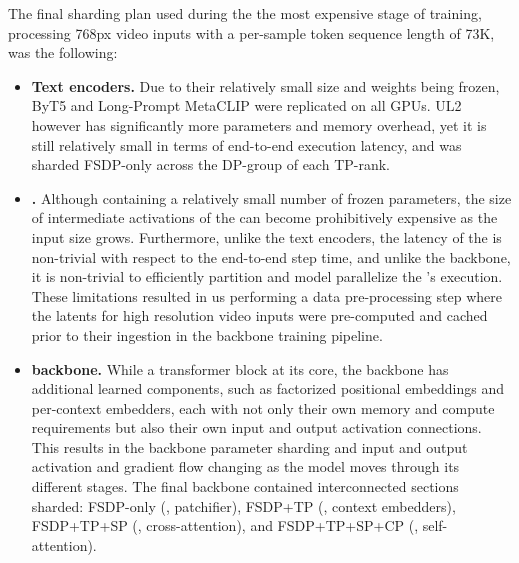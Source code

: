 The final sharding plan used during the the most expensive stage of \OursVideo training, processing 768px video inputs with a per-sample token sequence length of 73K, was the following:
\begin{itemize}
  \item \textbf{Text encoders.} Due to their relatively small size and weights being frozen, ByT5 and Long-Prompt MetaCLIP were replicated on all GPUs. UL2 however has significantly more parameters and memory overhead, yet it is still relatively small in terms of end-to-end execution latency, and was sharded FSDP-only across the DP-group of each TP-rank.
  \item \textbf{\taeShort.} Although containing a relatively small number of frozen parameters, the size of intermediate activations of the \taeShort can become prohibitively expensive as the input size grows. Furthermore, unlike the text encoders, the latency of the \taeShort is non-trivial with respect to the end-to-end step time, and unlike the backbone, it is non-trivial to efficiently partition and model parallelize the \taeShort's execution. These limitations resulted in us performing a data pre-processing step where the latents for high resolution video inputs were pre-computed and cached prior to their ingestion in the \OursVideo backbone training pipeline.
  \item \textbf{\OursVideo} \textbf{backbone.} While a transformer block at its core, the \OursVideo backbone has additional learned components, such as factorized positional embeddings and per-context embedders, each with not only their own memory and compute requirements but also their own input and output activation connections. This results in the backbone parameter sharding and input and output activation and gradient flow changing as the model moves through its different stages. The final backbone contained interconnected sections sharded: FSDP-only (\eg, patchifier), FSDP+TP (\eg, context embedders), FSDP+TP+SP (\eg, cross-attention), and FSDP+TP+SP+CP (\eg, self-attention).
\end{itemize}



